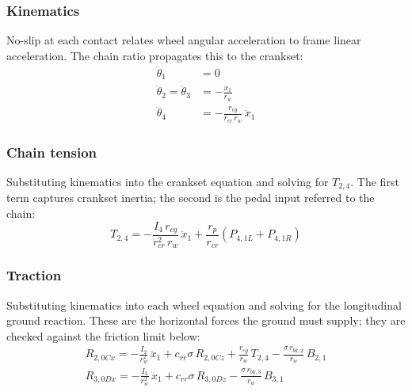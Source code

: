 \documentclass[10pt]{extarticle}
\numberwithin{equation}{subsubsection}
\begin{document}
\subsubsection{Kinematics}

No-slip at each contact relates wheel angular acceleration to frame linear acceleration. The chain ratio propagates this to the crankset:
\begin{align}
    \ddot{\theta}_1 &= 0 \\
    \ddot{\theta}_2 = \ddot{\theta}_3 &= -\frac{\ddot{x}_1}{r_w} \\
    \ddot{\theta}_4 &= -\frac{r_{cg}}{r_{cr}\,r_w}\,\ddot{x}_1
\end{align}

\subsubsection{Chain tension}

Substituting kinematics into the crankset equation and solving for $T_{2,4}$. The first term captures crankset inertia; the second is the pedal input referred to the chain:
\begin{equation}
    \boxed{T_{2,4} = -\frac{I_4\,r_{cg}}{r_{cr}^2\,r_w}\,\ddot{x}_1
           + \frac{r_p}{r_{cr}}\left(P_{4,1L} + P_{4,1R}\right)}
\end{equation}

\subsubsection{Traction}

Substituting kinematics into each wheel equation and solving for the longitudinal ground reaction. These are the horizontal forces the ground must supply; they are checked against the friction limit below:
\begin{align}
    \boxed{R_{2,0Cx} = -\frac{I_2}{r_w^2}\,\ddot{x}_1
        + c_{rr}\sigma\,R_{2,0Cz}
        + \frac{r_{cg}}{r_w}\,T_{2,4}
        - \frac{\sigma\,r_{bk,2}}{r_w}\,B_{2,1}} \\
    \boxed{R_{3,0Dx} = -\frac{I_3}{r_w^2}\,\ddot{x}_1
        + c_{rr}\sigma\,R_{3,0Dz}
        - \frac{\sigma\,r_{bk,3}}{r_w}\,B_{3,1}}
\end{align}
\end{document}

